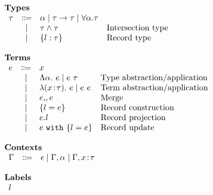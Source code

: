 \[
\begin{array}{l}

    \textbf{Types} \\
    \begin{array}{rcll}
        \tau & \Coloneqq & \alpha \mid \tau \to \tau \mid \forall \alpha. \tau & \\
          & \mid      & \tau \wedge \tau                                  & \text{Intersection type} \\
          & \mid      & \{ l : \tau \}                            & \text{Record type}
    \end{array} \\ \\

    \textbf{Terms} \\
    \begin{array}{rcll}
        e & \Coloneqq & x                               & \\
          & \mid      & \Lambda \alpha.~ e \mid {e} ~ {\tau} & \text{Type abstraction/application} \\
          & \mid      & \lambda (x \!:\! \tau).~ e \mid {e} ~ {e} & \text{Term abstraction/application} \\
          & \mid      & e ,\!, e                     & \text{Merge} \\
          & \mid      & \{ l = e \}                & \text{Record construction} \\
          & \mid      & e.l                             & \text{Record projection} \\
          & \mid      & e ~ \texttt{with} ~ \{ l = e \}             & \text{Record update}
    \end{array} \\ \\

    \textbf{Contexts} \\
    \begin{array}{rcl}
        \Gamma & \Coloneqq & \epsilon \mid \Gamma, \alpha \mid \Gamma, x \!:\! \tau
    \end{array} \\ \\

    \textbf{Labels} \\
    \begin{array}{r}
        l
    \end{array}

\end{array}
\]
